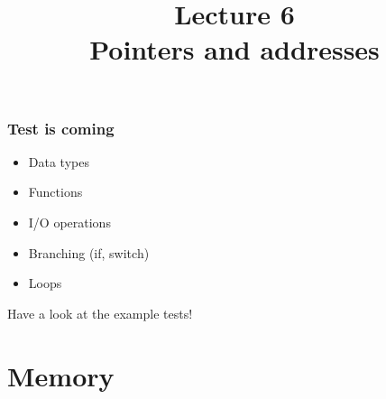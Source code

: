 \documentclass[10pt]{beamer}
\title{Lecture 6\\Pointers and addresses}
\date{}
\begin{document}
\frame{
    \titlepage
}

\begin{frame}
  \frametitle{Test is coming}
  \begin{itemize}
    \item Data types
    \item Functions
    \item I/O operations
    \item Branching (if, switch)
    \item Loops
  \end{itemize}
  
  Have a look at the example tests!
\end{frame}


\section{Memory}
\end{document}
